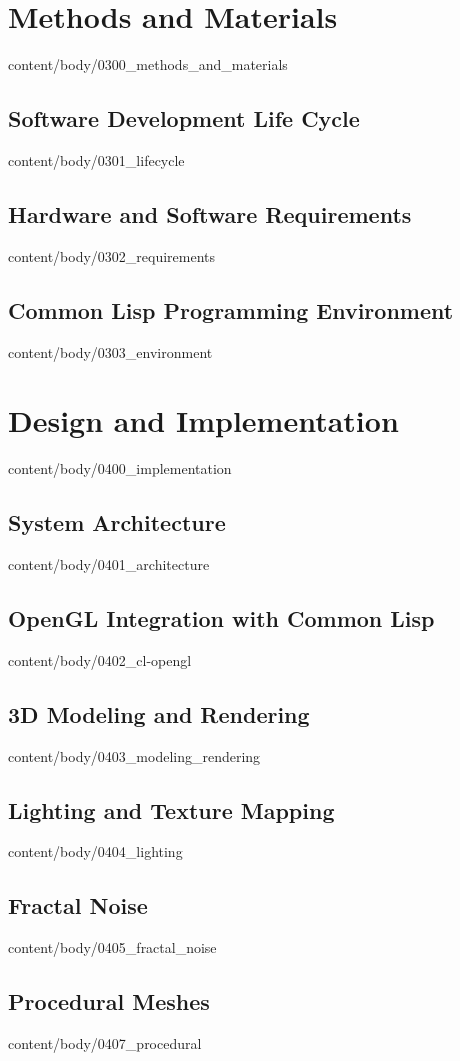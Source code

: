\documentclass[english, tfg, loc, lof, firstnumbered, epsbased]{tfgtfmthesisuam}
\begin{document}
\chapter{Methods and Materials}{content/body/0300_methods_and_materials}            %
  \section{Software Development Life Cycle}{content/body/0301_lifecycle}            %
  \section{Hardware and Software Requirements}{content/body/0302_requirements}      %
  \section{Common Lisp Programming Environment}{content/body/0303_environment}      %

\chapter{Design and Implementation}{content/body/0400_implementation}               %
  \section{System Architecture}{content/body/0401_architecture}                     %
  \section{OpenGL Integration with Common Lisp}{content/body/0402_cl-opengl}        %
  \section{3D Modeling and Rendering}{content/body/0403_modeling_rendering}         %
  \section{Lighting and Texture Mapping}{content/body/0404_lighting}                %
  \section{Fractal Noise}{content/body/0405_fractal_noise}                          %
  \section{Procedural Meshes}{content/body/0407_procedural}                         %
\end{document}
